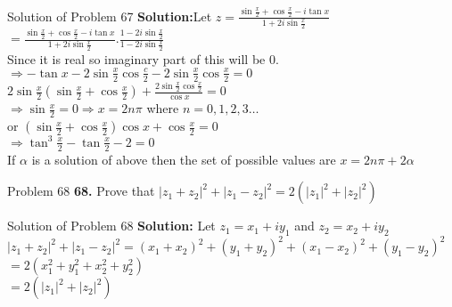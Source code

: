 \documentclass[aspectratio=169,8pt]{beamer}
\begin{document}
\begin{frame}{Solution of Problem 67}
  \textbf{Solution:}Let $z = \frac{\sin\frac{x}{2} + \cos\frac{x}{2} - i\tan x}{1 + 2i\sin\frac{x}{2}}$\\
  \vspace*{0.2cm}
  $= \frac{\sin\frac{x}{2} + \cos\frac{x}{2} - i\tan x}{1 + 2i\sin\frac{x}{2}}.\frac{1 - 2i\sin\frac{x}{2}}{1 - 2i\sin\frac{x}{2}}$\\
  \vspace*{0.2cm}
  Since it is real so imaginary part of this will be $0.$\\
  \vspace*{0.2cm}
  $\Rightarrow -\tan x -2\sin\frac{x}{2}\cos\frac{c}{2} -2\sin\frac{x}{2}\cos\frac{x}{2} = 0$\\
  \vspace*{0.2cm}
  $2\sin\frac{x}{2}\left(\sin\frac{x}{2} + \cos\frac{x}{2}\right) + \frac{2\sin\frac{x}{2}\cos\frac{x}{2}}{\cos x} = 0$\\
  \vspace*{0.2cm}
  $\Rightarrow \sin\frac{x}{2} = 0 \Rightarrow x = 2n\pi$ where $n = 0,1,2,3\ldots$\\
  \vspace*{0.2cm}
  or $\left(\sin\frac{x}{2} + \cos\frac{x}{2}\right)\cos x + \cos\frac{x}{2} = 0$\\
  \vspace*{0.2cm}
  $\Rightarrow \tan^3\frac{x}{2} - \tan\frac{x}{2} - 2 = 0$\\
  \vspace*{0.2cm}
  If $\alpha$ is a solution of above then the set of possible values are $x = 2n\pi + 2\alpha$
\end{frame}
\begin{frame}{Problem 68}
  \textbf{68.} Prove that $|z_1 + z_2|^2 + |z_1 - z_2|^2 = 2(|z_1|^2 + |z_2|^2)$
\end{frame}
\begin{frame}{Solution of Problem 68}
  \textbf{Solution:} Let $z_1 = x_1 + iy_1$ and $z_2 = x_2 + iy_2$\\
  \vspace*{0.2cm}
  $|z_1 + z_2|^2 + |z_1 - z_2|^2 = (x_1 + x_2)^2 + (y_1 + y_2)^2 + (x_1 - x_2)^2 + (y_1 - y_2)^2$\\
  \vspace*{0.2cm}
  $= 2(x_1^2 + y_1^2 + x_2^2 + y_2^2)$\\
  \vspace*{0.2cm}
  $= 2(|z_1|^2 + |z_2|^2)$
\end{frame}
\end{document}
